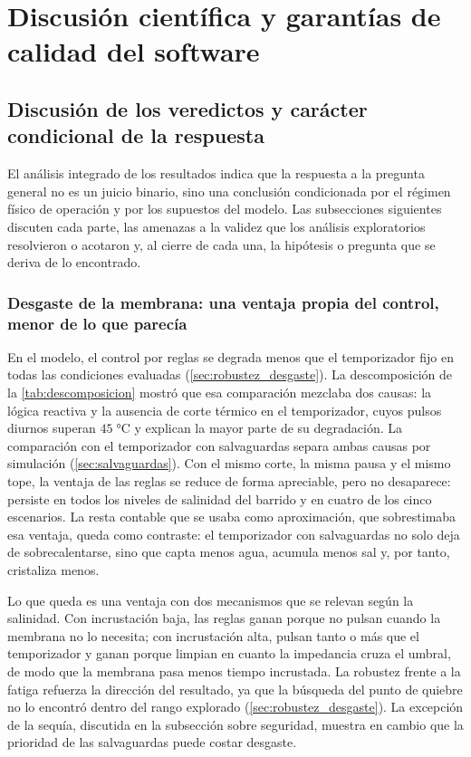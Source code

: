 \chapter{Discusi\'on cient\'ifica y garant\'ias de calidad del software}
\label{cap:discusion_calidad}

\section{Discusi\'on de los veredictos y car\'acter condicional de la respuesta}
El an\'alisis integrado de los resultados indica que la respuesta a la pregunta general no es un juicio binario, sino una conclusi\'on condicionada por el r\'egimen f\'isico de operaci\'on y por los supuestos del modelo. Las subsecciones siguientes discuten cada parte, las amenazas a la validez que los an\'alisis exploratorios resolvieron o acotaron y, al cierre de cada una, la hip\'otesis o pregunta que se deriva de lo encontrado.

\subsection{Desgaste de la membrana: una ventaja propia del control, menor de lo que parec\'ia}
En el modelo, el control por reglas se degrada menos que el temporizador fijo en todas las condiciones evaluadas (\cref{sec:robustez_desgaste}). La descomposici\'on de la \cref{tab:descomposicion} mostr\'o que esa comparaci\'on mezclaba dos causas: la l\'ogica reactiva y la ausencia de corte t\'ermico en el temporizador, cuyos pulsos diurnos superan $45\;\si{\celsius}$ y explican la mayor parte de su degradaci\'on. La comparaci\'on con el temporizador con salvaguardas separa ambas causas por simulaci\'on (\cref{sec:salvaguardas}). Con el mismo corte, la misma pausa y el mismo tope, la ventaja de las reglas se reduce de forma apreciable, pero no desaparece: persiste en todos los niveles de salinidad del barrido y en cuatro de los cinco escenarios. La resta contable que se usaba como aproximaci\'on, que sobrestimaba esa ventaja, queda como contraste: el temporizador con salvaguardas no solo deja de sobrecalentarse, sino que capta menos agua, acumula menos sal y, por tanto, cristaliza menos.

Lo que queda es una ventaja con dos mecanismos que se relevan seg\'un la salinidad. Con incrustaci\'on baja, las reglas ganan porque no pulsan cuando la membrana no lo necesita; con incrustaci\'on alta, pulsan tanto o m\'as que el temporizador y ganan porque limpian en cuanto la impedancia cruza el umbral, de modo que la membrana pasa menos tiempo incrustada. La robustez frente a la fatiga refuerza la direcci\'on del resultado, ya que la b\'usqueda del punto de quiebre no lo encontr\'o dentro del rango explorado (\cref{sec:robustez_desgaste}). La excepci\'on de la sequ\'ia, discutida en la subsecci\'on sobre seguridad, muestra en cambio que la prioridad de las salvaguardas puede costar desgaste.

